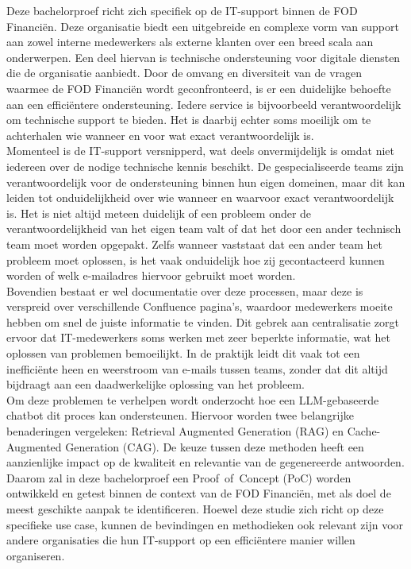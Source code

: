 Deze bachelorproef richt zich specifiek op de IT-support binnen de FOD Financiën. Deze organisatie biedt een uitgebreide en complexe vorm van support aan zowel interne medewerkers als externe klanten over een breed scala aan onderwerpen. Een deel hiervan is technische ondersteuning voor digitale diensten die de organisatie aanbiedt. Door de omvang en diversiteit van de vragen waarmee de FOD Financiën wordt geconfronteerd, is er een duidelijke behoefte aan een efficiëntere ondersteuning. Iedere service is bijvoorbeeld verantwoordelijk om technische support te bieden. Het is daarbij echter soms moeilijk om te achterhalen wie wanneer en voor wat exact verantwoordelijk is. 
\\[1em]
Momenteel is de IT-support versnipperd, wat deels onvermijdelijk is omdat niet iedereen over de nodige technische kennis beschikt. De gespecialiseerde teams zijn verantwoordelijk voor de ondersteuning binnen hun eigen domeinen, maar dit kan leiden tot onduidelijkheid over wie wanneer en waarvoor exact verantwoordelijk is. Het is niet altijd meteen duidelijk of een probleem onder de verantwoordelijkheid van het eigen team valt of dat het door een ander technisch team moet worden opgepakt. Zelfs wanneer vaststaat dat een ander team het probleem moet oplossen, is het vaak onduidelijk hoe zij gecontacteerd kunnen worden of welk e-mailadres hiervoor gebruikt moet worden.
\\[1em]
Bovendien bestaat er wel documentatie over deze processen, maar deze is verspreid over verschillende Confluence pagina’s, waardoor medewerkers moeite hebben om snel de juiste informatie te vinden. Dit gebrek aan centralisatie zorgt ervoor dat IT-medewerkers soms werken met zeer beperkte informatie, wat het oplossen van problemen bemoeilijkt. In de praktijk leidt dit vaak tot een inefficiënte heen en weerstroom van e-mails tussen teams, zonder dat dit altijd bijdraagt aan een daadwerkelijke oplossing van het probleem.
\\[1em]
Om deze problemen te verhelpen wordt onderzocht hoe een LLM-gebaseerde chatbot dit proces kan ondersteunen. Hiervoor worden twee belangrijke benaderingen vergeleken: Retrieval Augmented Generation (RAG) en Cache-Augmented Generation (CAG). De keuze tussen deze methoden heeft een aanzienlijke impact op de kwaliteit en relevantie van de gegenereerde antwoorden. Daarom zal in deze bachelorproef een Proof~of~Concept (PoC) worden ontwikkeld en getest binnen de context van de FOD Financiën, met als doel de meest geschikte aanpak te identificeren. Hoewel deze studie zich richt op deze specifieke use case, kunnen de bevindingen en methodieken ook relevant zijn voor andere organisaties die hun IT-support op een efficiëntere manier willen organiseren.

